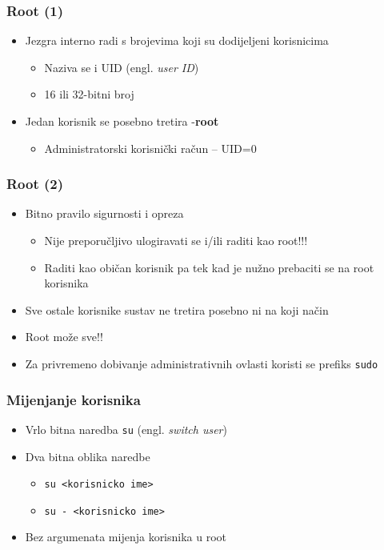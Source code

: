 \documentclass[table,usenames,dvipsnames] {beamer}
\newcommand{\shell}[1]{\texttt{#1}}
\begin{document}
\begin{frame}[t]
\frametitle{Root (1)} 
\begin{itemize}
  \item Jezgra interno radi s brojevima koji su dodijeljeni korisnicima
  \begin{itemize}
    \item Naziva se i UID (engl. \emph{user ID})
    \item 16 ili 32-bitni broj
  \end{itemize}
  \item Jedan korisnik se posebno tretira -\bf{root}
  \begin{itemize}
    \item Administratorski korisnički račun -- UID=0
  \end{itemize}
\end{itemize}
\end{frame}

\begin{frame}[t]
\frametitle{Root (2)} 
\begin{itemize}
  \item Bitno pravilo sigurnosti i opreza
  \begin{itemize}
    \item Nije preporučljivo ulogiravati se i/ili raditi kao root!!!
    \item Raditi kao običan korisnik pa tek kad je nužno prebaciti se na 
          root korisnika
  \end{itemize}
  \item Sve ostale korisnike sustav ne tretira posebno ni na koji način
  \item Root može sve!!
  \item Za privremeno dobivanje administrativnih ovlasti koristi se prefiks \shell {sudo}
\end{itemize}
\end{frame}

\begin{frame}[t]
\frametitle{Mijenjanje korisnika} 
\begin{itemize}
  \item Vrlo bitna naredba \shell{su} (engl. \emph{switch user})
  \item Dva bitna oblika naredbe
  \begin{itemize}
    \item \shell{su <korisnicko ime>}
    \item \shell{su - <korisnicko ime>}
  \end{itemize}
  \item Bez argumenata mijenja korisnika u root
\end{itemize}
\end{frame}
\end{document}
